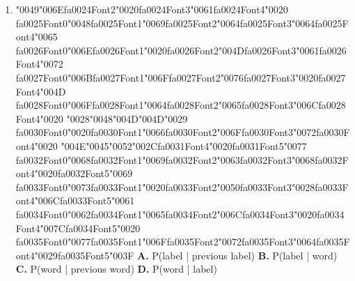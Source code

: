 \documentclass[11pt]{article}
\begin{document}
\begin{enumerate}[leftmargin=*]
  \item {\char"0049}{\char"006E}{\csname fa0024Font2\endcsname\char"0020}{\csname fa0024Font3\endcsname\char"0061}{\csname fa0024Font4\endcsname\char"0020} {\csname fa0025Font0\endcsname\char"0048}{\csname fa0025Font1\endcsname\char"0069}{\csname fa0025Font2\endcsname\char"0064}{\csname fa0025Font3\endcsname\char"0064}{\csname fa0025Font4\endcsname\char"0065} {\csname fa0026Font0\endcsname\char"006E}{\csname fa0026Font1\endcsname\char"0020}{\csname fa0026Font2\endcsname\char"004D}{\csname fa0026Font3\endcsname\char"0061}{\csname fa0026Font4\endcsname\char"0072} {\csname fa0027Font0\endcsname\char"006B}{\csname fa0027Font1\endcsname\char"006F}{\csname fa0027Font2\endcsname\char"0076}{\csname fa0027Font3\endcsname\char"0020}{\csname fa0027Font4\endcsname\char"004D} {\csname fa0028Font0\endcsname\char"006F}{\csname fa0028Font1\endcsname\char"0064}{\csname fa0028Font2\endcsname\char"0065}{\csname fa0028Font3\endcsname\char"006C}{\csname fa0028Font4\endcsname\char"0020} {\char"0028}{\char"0048}{\char"004D}{\char"004D}{\char"0029} {\csname fa0030Font0\endcsname\char"0020}{\csname fa0030Font1\endcsname\char"0066}{\csname fa0030Font2\endcsname\char"006F}{\csname fa0030Font3\endcsname\char"0072}{\csname fa0030Font4\endcsname\char"0020} {\char"004E}{\char"0045}{\char"0052}{\char"002C}{\csname fa0031Font4\endcsname\char"0020}{\csname fa0031Font5\endcsname\char"0077} {\csname fa0032Font0\endcsname\char"0068}{\csname fa0032Font1\endcsname\char"0069}{\csname fa0032Font2\endcsname\char"0063}{\csname fa0032Font3\endcsname\char"0068}{\csname fa0032Font4\endcsname\char"0020}{\csname fa0032Font5\endcsname\char"0069} {\csname fa0033Font0\endcsname\char"0073}{\csname fa0033Font1\endcsname\char"0020}{\csname fa0033Font2\endcsname\char"0050}{\csname fa0033Font3\endcsname\char"0028}{\csname fa0033Font4\endcsname\char"006C}{\csname fa0033Font5\endcsname\char"0061} {\csname fa0034Font0\endcsname\char"0062}{\csname fa0034Font1\endcsname\char"0065}{\csname fa0034Font2\endcsname\char"006C}{\csname fa0034Font3\endcsname\char"0020}{\csname fa0034Font4\endcsname\char"007C}{\csname fa0034Font5\endcsname\char"0020} {\csname fa0035Font0\endcsname\char"0077}{\csname fa0035Font1\endcsname\char"006F}{\csname fa0035Font2\endcsname\char"0072}{\csname fa0035Font3\endcsname\char"0064}{\csname fa0035Font4\endcsname\char"0029}{\csname fa0035Font5\endcsname\char"003F}
    \textbf{A.} P(label | previous label)
    \textbf{B.} P(label | word)
    \textbf{C.} P(word | previous word)
    \textbf{D.} P(word | label)


\end{enumerate}
\end{document}
